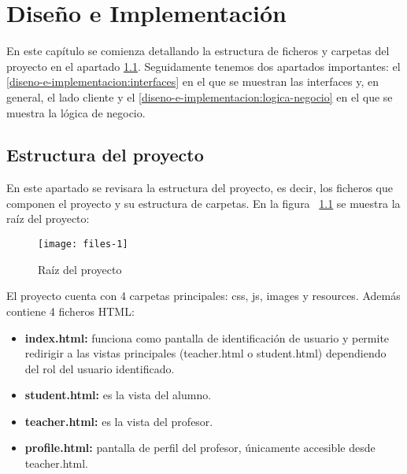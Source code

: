 
\chapter{Diseño e Implementación}
\label{diseno-e-implementacion}

En este capítulo se comienza detallando la estructura de ficheros y carpetas del proyecto en el apartado \ref{diseno-e-implementacion:estructura}. Seguidamente tenemos dos apartados importantes: el \ref{diseno-e-implementacion:interfaces} en el que se muestran las interfaces y, en general, el lado cliente y el \ref{diseno-e-implementacion:logica-negocio} en el que se muestra la lógica de negocio.\\

\section{Estructura del proyecto}
\label{diseno-e-implementacion:estructura}

En este apartado se revisara la estructura del proyecto, es decir, los ficheros que componen el proyecto y su estructura de carpetas. En la figura ~\ref{fig:files-1} se muestra la raíz del proyecto:\\

\begin{figure}[h]
	\texttt{[image: files-1]}
	\caption{Raíz del proyecto}
	\label{fig:files-1}
\end{figure}

El proyecto cuenta con 4 carpetas principales: css, js, images y resources. Además contiene 4 ficheros HTML:

\begin{itemize}
\item \textbf{index.html:} funciona como pantalla de identificación de usuario y permite redirigir a las vistas principales (teacher.html o student.html) dependiendo del rol del usuario identificado.
\item \textbf{student.html:} es la vista del alumno.
\item \textbf{teacher.html:} es la vista del profesor.
\item \textbf{profile.html:} pantalla de perfil del profesor, únicamente accesible desde teacher.html.
\end{itemize}

